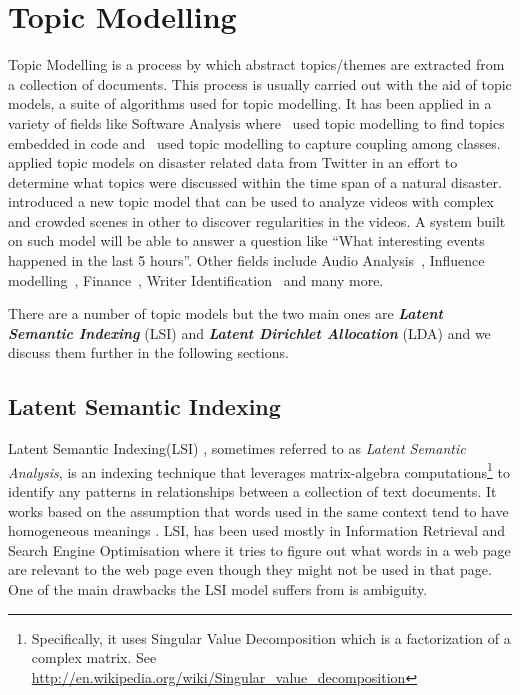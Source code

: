 \section{Topic Modelling}
\label{sec:bg_topic_modelling}
Topic Modelling is a process by which abstract topics/themes are extracted from a collection of
documents. This process is usually carried out with the aid of topic models, a suite of algorithms
used for topic modelling. It has been applied in a variety of fields like Software Analysis
where~\citet{linstead2009software} used topic modelling to find topics embedded in code
and~\citet{gethers2010using} used topic modelling to capture coupling among
classes.~\citet{kireyev2009applications} applied topic models on disaster related data from Twitter
in an effort to determine what topics were discussed within the time span of a natural
disaster.~\citet{hospedales2009markov} introduced a new topic model that can be used to analyze
videos with complex and crowded scenes in other to discover regularities in the videos. A system
built on such model will be able to answer a question like ``What interesting events happened in the
last 5 hours''. Other fields include Audio Analysis~\citep{smaragdis2009topic}, Influence
modelling~\citep{gerrish2009modeling}, Finance~\citep{doyle2009financial}, Writer
Identification~\citep{bhardwaj2009writer} and many more.

There are a number of topic models but the two main ones are \textbf{\textit{Latent Semantic
Indexing}} (LSI) and \textbf{\textit{Latent Dirichlet Allocation}} (LDA) and we discuss them further
in the following sections.


\subsection{Latent Semantic Indexing}
\label{sub:bg_lsa}
Latent Semantic Indexing(LSI) \citep{hofmann1999probabilistic}, sometimes referred to as
\textit{Latent Semantic Analysis}, is an indexing technique that leverages matrix-algebra
computations\footnote{Specifically, it uses Singular Value Decomposition which is a factorization of
a complex matrix. See \url{http://en.wikipedia.org/wiki/Singular_value_decomposition}} to identify
any patterns in relationships between a collection of text documents. It works based on the
assumption that words used in the same context tend to have homogeneous meanings
\citep{deerwester1990indexing,dumais2004latent,landauer2006latent}. LSI, has been used mostly in
Information Retrieval and Search Engine Optimisation where it tries to figure out what words in a
web page are relevant to the web page even though they might not be used in that page. One of the
main drawbacks the LSI model suffers from is ambiguity.

